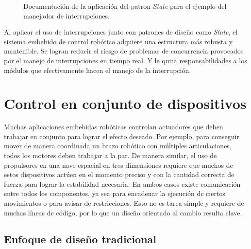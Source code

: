 \begin{figure}
\caption{Documentación de la aplicación del patron \textit{State} para el ejemplo del manejador de interrupciones.}
\label{docStateInt}
\end{figure}


Al aplicar el uso de interrupciones junto con patrones de diseño como \textit{State}, el sistema embebido de control robótico adquiere una estructura más robusta y mantenible. Se logran reducir el riesgo de problemas de concurrencia provocados por el manejo de interrupciones en tiempo real. Y le quita responsabilidades a los módulos que efectivamente hacen el manejo de la interrupción.



\section{Control en conjunto de dispositivos}
Muchas aplicaciones embebidas robóticas controlan \gls{actuadores} que deben trabajar en conjunto para lograr el efecto deseado. Por ejemplo, para conseguir mover de manera coordinada un brazo robótico con múltiples articulaciones, todos los motores deben trabajar a la par. De manera similar, el uso de propulsores en una nave espacial en tres dimensiones requiere que muchos de estos dispositivos actúen en el momento preciso y con la cantidad correcta de fuerza para lograr la estabilidad necesaria. En ambos casos existe comunicación entre todos los componentes, ya sea para encadenar la ejecución de ciertos movimientos o para avisar de restricciones. Esto no es tarea simple y requiere de muchas líneas de código, por lo que un diseño orientado al cambio resulta clave.

\subsection*{Enfoque de diseño tradicional}

